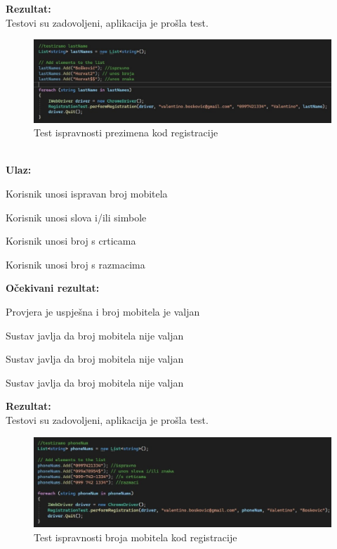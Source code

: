 			\noindent \textbf{Rezultat:}\\
			Testovi su zadovoljeni, aplikacija je prošla test.\\
			\begin{figure}[H]
				\includegraphics[width=\textwidth]{1test_1_prezime.JPEG}
				\centering
				\caption{Test ispravnosti prezimena kod registracije}
				\label{fig:testprezime}
			\end{figure}
			
			\noindent {}\\
			\textbf{Ulaz: }	
			\begin{packed_enum}
				\item Korisnik unosi ispravan broj mobitela
				\item Korisnik unosi slova i/ili simbole
				\item Korisnik unosi broj s crticama
				\item Korisnik unosi broj s razmacima
				
			\end{packed_enum}
			
			\noindent \textbf{Očekivani rezultat:}
			
			\begin{packed_enum}
				\item Provjera je uspješna i broj mobitela je valjan
				\item Sustav javlja da broj mobitela nije valjan
				\item Sustav javlja da broj mobitela nije valjan
				\item Sustav javlja da broj mobitela nije valjan
				
			\end{packed_enum}
			
			\noindent \textbf{Rezultat:}\\
			Testovi su zadovoljeni, aplikacija je prošla test.\\
			\begin{figure}[H]
				\includegraphics[width=\textwidth]{1test_1_broj.JPEG}
				\centering
				\caption{Test ispravnosti broja mobitela kod registracije}
				\label{fig:testbroj}
			\end{figure}
			
